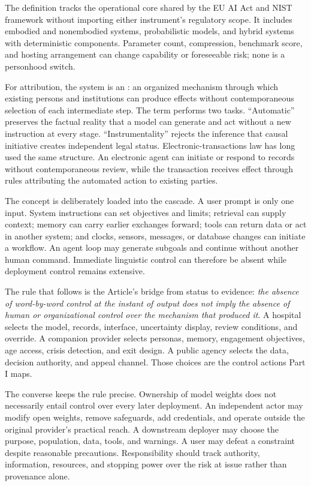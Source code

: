 The definition tracks the operational core shared by the EU AI Act and NIST framework without importing either instrument's regulatory scope. It includes embodied and nonembodied systems, probabilistic models, and hybrid systems with deterministic components. Parameter count, compression, benchmark score, and hosting arrangement can change capability or foreseeable risk; none is a personhood switch.

For attribution, the system is an : an organized mechanism through which existing persons and institutions can produce effects without contemporaneous selection of each intermediate step. The term performs two tasks. ``Automatic'' preserves the factual reality that a model can generate and act without a new instruction at every stage. ``Instrumentality'' rejects the inference that causal initiative creates independent legal status. Electronic-transactions law has long used the same structure. An electronic agent can initiate or respond to records without contemporaneous review, while the transaction receives effect through rules attributing the automated action to existing parties.

The concept is deliberately loaded into the cascade. A user prompt is only one input. System instructions can set objectives and limits; retrieval can supply context; memory can carry earlier exchanges forward; tools can return data or act in another system; and clocks, sensors, messages, or database changes can initiate a workflow. An agent loop may generate subgoals and continue without another human command. Immediate linguistic control can therefore be absent while deployment control remains extensive.

The rule that follows is the Article's bridge from status to evidence: \emph{the absence of word-by-word control at the instant of output does not imply the absence of human or organizational control over the mechanism that produced it}. A hospital selects the model, records, interface, uncertainty display, review conditions, and override. A companion provider selects personas, memory, engagement objectives, age access, crisis detection, and exit design. A public agency selects the data, decision authority, and appeal channel. Those choices are the control actions Part I maps.

The converse keeps the rule precise. Ownership of model weights does not necessarily entail control over every later deployment. An independent actor may modify open weights, remove safeguards, add credentials, and operate outside the original provider's practical reach. A downstream deployer may choose the purpose, population, data, tools, and warnings. A user may defeat a constraint despite reasonable precautions. Responsibility should track authority, information, resources, and stopping power over the risk at issue rather than provenance alone.

